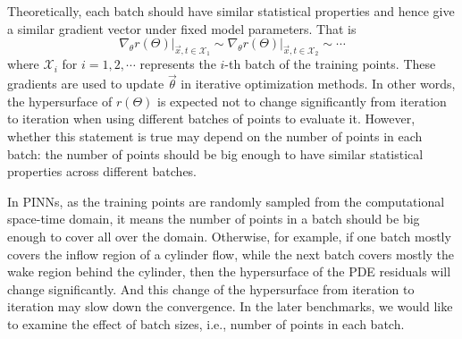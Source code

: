 Theoretically, each batch should have similar statistical properties and hence give a similar gradient vector under fixed model parameters.
That is
\begin{equation}
\left.\nabla_\theta r(\Theta) \right|_{\vec{x}, t \in \mathcal{X}_1} \sim
\left.\nabla_\theta r(\Theta) \right|_{\vec{x}, t \in \mathcal{X}_2} \sim
\cdots
\end{equation}
where $\mathcal{X}_i$ for $i=1,2,\cdots$ represents the $i$-th batch of the training points.
These gradients are used to update $\vec{\theta}$ in iterative optimization methods.
In other words, the hypersurface of $r(\Theta)$ is expected not to change significantly from iteration to iteration when using different batches of points to evaluate it.
However, whether this statement is true may depend on the number of points in each batch: the number of points should be big enough to have similar statistical properties across different batches.

In PINNs, as the training points are randomly sampled from the computational space-time domain, it means the number of points in a batch should be big enough to cover all over the domain.
Otherwise, for example, if one batch mostly covers the inflow region of a cylinder flow, while the next batch covers mostly the wake region behind the cylinder, then the hypersurface of the PDE residuals will change significantly.
And this change of the hypersurface from iteration to iteration may slow down the convergence.
In the later benchmarks, we would like to examine the effect of batch sizes, i.e., number of points in each batch. 

